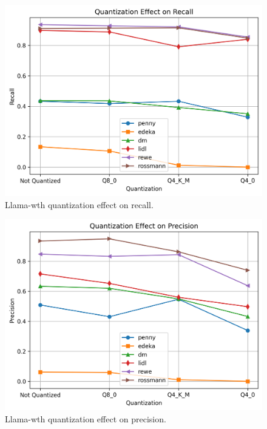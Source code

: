 \documentclass[licencjacka,en]{pracamgr}
\begin{document}
\begin{figure}[htbp]
    \centering
    \includegraphics[width=0.8\linewidth]{bachelor_images/quant_comp/quantization_effect_on_recall.png}
    \caption{Llama-wth quantization effect on recall.}
    \label{fig:quantization_effect_on_recall}
\end{figure}

\begin{figure}[htbp]
    \centering
    \includegraphics[width=0.8\linewidth]{bachelor_images/quant_comp/quantization_effect_on_precision.png}
    \caption{Llama-wth quantization effect on precision.}
    \label{fig:quantization_effect_on_precision}
\end{figure}
\end{document}
